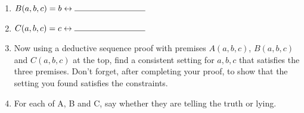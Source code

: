 \documentclass[12pt]{article}
\begin{document}
\begin{enumerate}[(a)]
     
     \begin{enumerate}
         \item[(i)] $B(a,b,c) =  b \leftrightarrow  \rule{3cm}{0.4pt}$
         \item[(ii)] $C(a,b,c) =  c \leftrightarrow  \rule{3cm}{0.4pt}$
         \item[(iii)] Now using a deductive sequence proof with premises  $A(a,b,c)$, $B(a,b,c)$ and $C(a,b,c)$  at the top, find a consistent setting for $a,b,c$  that satisfies the three premises.  Don't forget, after completing your proof, to show that the setting you found satisfies the constraints.     
         \item[(iv)] For each of A, B and C, say whether they are telling the truth or lying.
     \end{enumerate}
\end{enumerate}


\newpage
\end{document}

